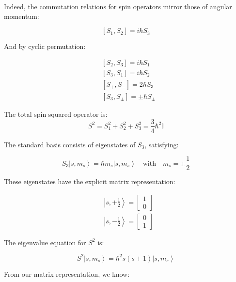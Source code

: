 \documentclass[italian]{HKNdocument}
\begin{document}
Indeed, the commutation relations for spin operators mirror those of angular momentum:

\begin{equation}
\left[S_{1}, S_{2}\right]=i \hbar S_{3} \label{eq:11.10}
\end{equation}

And by cyclic permutation:

\begin{align}
& {\left[S_{2}, S_{3}\right]=i \hbar S_{1}} \\
& {\left[S_{3}, S_{1}\right]=i \hbar S_{2}} \\
& {\left[S_{+}, S_{-}\right]=2 \hbar S_{3}}  \label{eq:11.11}\\
& {\left[S_{3}, S_{\pm}\right]=\pm \hbar S_{\pm}}
\end{align}

The total spin squared operator is:
\begin{equation}
S^{2}=S_{1}^{2}+S_{2}^{2}+S_{3}^{2}=\frac{3}{4} \hbar^{2} \mathbb{I}
\end{equation}

The standard basis consists of eigenstates of $S_3$, satisfying:

\begin{equation}
S_{3}\left|s, m_{s}\right\rangle=\hbar m_{s}\left|s, m_{s}\right\rangle \quad \text{with} \quad m_{s}=\pm\frac{1}{2} \label{eq:11.12}
\end{equation}

These eigenstates have the explicit matrix representation:

\begin{align}
& \left|s,+\frac{1}{2}\right\rangle=\left[\begin{array}{l}
1 \\
0
\end{array}\right]  \label{eq:11.13}\\
& \left|s,-\frac{1}{2}\right\rangle=\left[\begin{array}{l}
0 \\
1
\end{array}\right]
\end{align}

The eigenvalue equation for $S^2$ is:

\begin{equation}
S^{2}\left|s, m_{s}\right\rangle=\hbar^{2} s(s+1)\left|s, m_{s}\right\rangle \label{eq:11.14}
\end{equation}

From our matrix representation, we know:
\end{document}
